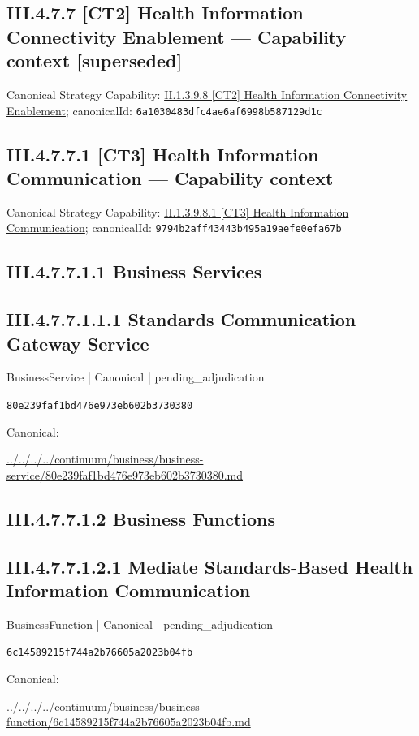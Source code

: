 \documentclass[10pt,a4paper]{article}
\begin{document}
\subsection*{III.4.7.7 [CT2] Health Information Connectivity Enablement — Capability context [superseded]}
Canonical Strategy Capability: \hyperref[element-6a1030483dfc4ae6af6998b587129d1c]{II.1.3.9.8 [CT2] Health Information Connectivity Enablement}; canonicalId: \texttt{6a1030483dfc4ae6af6998b587129d1c}\par
\subsection*{III.4.7.7.1 [CT3] Health Information Communication — Capability context}
Canonical Strategy Capability: \hyperref[element-9794b2aff43443b495a19aefe0efa67b]{II.1.3.9.8.1 [CT3] Health Information Communication}; canonicalId: \texttt{9794b2aff43443b495a19aefe0efa67b}\par
\subsection*{III.4.7.7.1.1 Business Services}
\subsection*{III.4.7.7.1.1.1 Standards Communication Gateway Service}
\label{element-80e239faf1bd476e973eb602b3730380}
{\small BusinessService | Canonical | pending\_adjudication}\par
\texttt{80e239faf1bd476e973eb602b3730380}\par
Canonical: \par
{\footnotesize\url{../../../../continuum/business/business-service/80e239faf1bd476e973eb602b3730380.md}}\par
\subsection*{III.4.7.7.1.2 Business Functions}
\subsection*{III.4.7.7.1.2.1 Mediate Standards-Based Health Information Communication}
\label{element-6c14589215f744a2b76605a2023b04fb}
{\small BusinessFunction | Canonical | pending\_adjudication}\par
\texttt{6c14589215f744a2b76605a2023b04fb}\par
Canonical: \par
{\footnotesize\url{../../../../continuum/business/business-function/6c14589215f744a2b76605a2023b04fb.md}}\par
\end{document}
